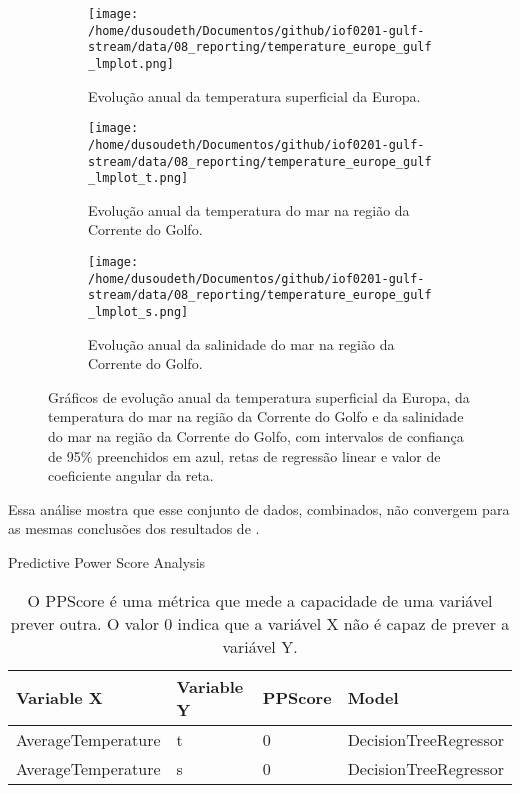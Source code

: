 \documentclass[journal]{IEEEtran}
\begin{document}
            \begin{figure*}
                \centering
                \begin{subfigure}[b]{0.3\linewidth}
                    \texttt{[image: /home/dusoudeth/Documentos/github/iof0201-gulf-stream/data/08\_reporting/temperature\_europe\_gulf\_lmplot.png]}
                    \caption{Evolução anual da temperatura superficial da Europa.}
                    \label{fig:img_temperature_europe_gulf_lmplot}
                \end{subfigure}
                \begin{subfigure}[b]{0.3\linewidth}
                    \texttt{[image: /home/dusoudeth/Documentos/github/iof0201-gulf-stream/data/08\_reporting/temperature\_europe\_gulf\_lmplot\_t.png]}
                    \caption{Evolução anual da temperatura do mar na região da Corrente do Golfo.}
                    \label{fig:img_temperature_europe_gulf_lmplot_t}
                \end{subfigure}
                \begin{subfigure}[b]{0.3\linewidth}
                    \texttt{[image: /home/dusoudeth/Documentos/github/iof0201-gulf-stream/data/08\_reporting/temperature\_europe\_gulf\_lmplot\_s.png]}
                    \caption{Evolução anual da salinidade do mar na região da Corrente do Golfo.}
                    \label{fig:img_temperature_europe_gulf_lmplot_s}
                \end{subfigure}
                \caption{Gráficos de evolução anual da temperatura superficial da Europa, da temperatura do mar na região da Corrente do Golfo e da salinidade do mar na região da Corrente do Golfo, com intervalos de confiança de 95\% preenchidos em azul, retas de regressão linear e valor de coeficiente angular da reta.}
                \label{fig:img_temperature_europe_gulf_lmplot_s_t}
            \end{figure*}\newline
            Essa análise mostra que esse conjunto de dados, combinados, não convergem para as mesmas conclusões dos resultados de \cite{Bromley2018,Cheng2019}.
            \begin{table}[ht]
                \centering
                \caption{Predictive Power Score Analysis}
                \begin{tabular}{|l|l|l|l|}
                \hline
                Variable X & Variable Y & PPScore & Model \\ \hline
                AverageTemperature & t & 0 & DecisionTreeRegressor \\ \hline
                AverageTemperature & s & 0 & DecisionTreeRegressor \\ \hline
                \end{tabular}
                \caption*{O PPScore é uma métrica que mede a capacidade de uma variável prever outra. O valor 0 indica que a variável X não é capaz de prever a variável Y.}
                \label{tab:pps}
            \end{table}
\end{document}
